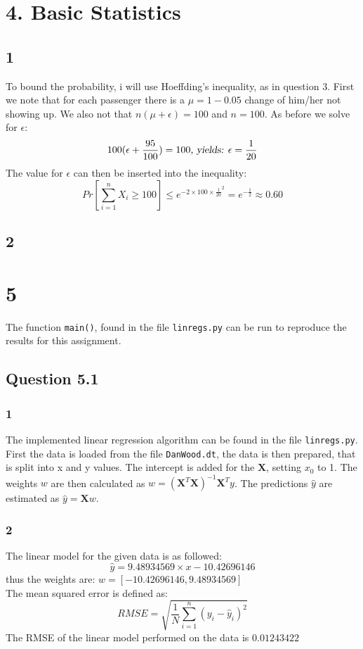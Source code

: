 \documentclass{article}
\begin{document}
\section{4. Basic Statistics}
\subsection{1}
To bound the probability, i will use Hoeffding's inequality, as in question 3. First we note that for each passenger there is a $\mu = 1-0.05$ change of him/her not showing up. We also not that $n(\mu + \epsilon) = 100$ and $n=100$. As before we solve for $\epsilon$:
$$ 
100(\epsilon + \frac{95}{100}) = 100 \textsl{, yields: } \epsilon = \dfrac{1}{20}
$$
The value for $\epsilon$ can then be inserted into the inequality:
\begin{equation*}
Pr \left[ \sum\limits^{n}_{i=1}X_i \geq 100 \right] \leq e^{-2 \times 100 \times \frac{1}{20}^2} = e^{-\frac{1}{2}}  \approx 0.60
\end{equation*}
\subsection{2}
\section{5}
The function \texttt{main()}, found in the file \texttt{linregs.py} can be run to reproduce the results for this assignment.
\subsection{Question 5.1}
\subsubsection{1}
The implemented linear regression algorithm can be found in the file \texttt{linregs.py}. \\
First the data is loaded from the file \texttt{DanWood.dt}, the data is then prepared, that is split into x and y values. The intercept is added for the $\mathbf{X}$, setting $x_0$ to 1. The weights $w$ are then calculated as  $w = (\mathbf{X}^T \mathbf{X})^{-1}\mathbf{X}^T y$. The predictions $\hat{y}$ are estimated as $ \hat{y} = \mathbf{X}w$.
\subsubsection{2}
The linear model for the given data is as followed: 
$$ \hat{y} = 9.48934569 \times x - 10.42696146 $$
thus the weights are: $w=[-10.42696146,9.48934569]$ \\ The mean squared error is defined as:
\begin{equation*}
RMSE = \sqrt{ \dfrac{1}{N} \sum\limits^{n}_{i=1} (y_i - \hat{y}_i )^2}
\end{equation*}
The RMSE of the linear model performed on the data is $0.01243422$
\end{document}
